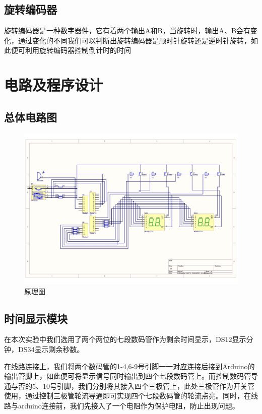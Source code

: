 \documentclass{../source/zjureport}
\begin{document}
        \subsection{旋转编码器}
         旋转编码器是一种数字器件，它有着两个输出A和B，当旋转时，输出A、B会有变化，通过变化的不同我们可以判断出旋转编码器是顺时针旋转还是逆时针旋转，如此便可利用旋转编码器控制倒计时的时间

    \newpage
    \section{电路及程序设计}
        \subsection{总体电路图}
        \begin{figure}[thp]
            \centering
            \includegraphics[scale = 0.55]{figures/Schematic Prints.jpg}
            \caption{原理图}
        \end{figure}

        \subsection{时间显示模块}
        在本次实验中我们选用了两个两位的七段数码管作为剩余时间显示，DS12显示分钟，DS34显示剩余秒数。


        在线路连接上，我们将两个数码管的1-4,6-9号引脚一一对应连接后接到Arduino的输出管脚上，如此便可将显示信号同时输出到四个七段数码管上。而控制数码管导通与否的5、10号引脚，我们分别将其接入四个三极管上，此处三极管作为开关管使用，通过控制三极管轮流导通即可实现四个七段数码管的轮流点亮。同时，在线路与arduino连接前，我们先接入了一个电阻作为保护电阻，防止出现问题。
\end{document}
